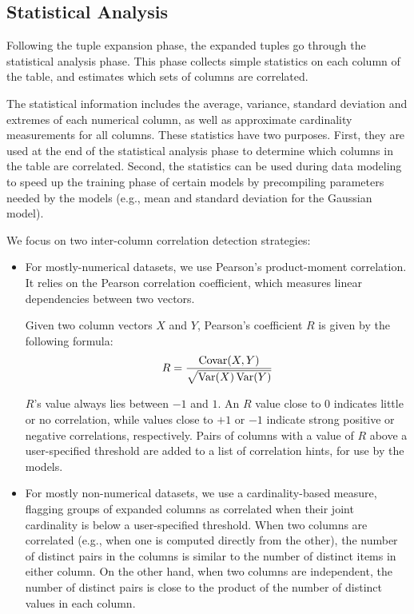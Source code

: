 \subsection{Statistical Analysis}
\label{sec:statistical-analysis}

Following the tuple expansion phase, the expanded tuples go through the statistical analysis phase. This phase collects simple statistics on each column of the table, and estimates which sets of columns are correlated.

The statistical information includes the average, variance, standard deviation and extremes of each numerical column, as well as approximate cardinality measurements for all columns. These statistics have two purposes. First, they are used at the end of the statistical analysis phase to determine which columns in the table are correlated. Second, the statistics can be used during data modeling to speed up the training phase of certain models by precompiling parameters needed by the models (e.g., mean and standard deviation for the Gaussian model).

We focus on two inter-column correlation detection strategies:

\begin{itemize}
\item For mostly-numerical datasets, we use Pearson's product-moment
  correlation. It relies on the Pearson correlation coefficient,
  which measures linear dependencies between two vectors.

  Given two column vectors $X$ and $Y$, Pearson's coefficient $R$ is given by the following formula:
  \begin{align}
    \label{eqn:pearson}
    R = \frac{\operatorname{Covar}(X,Y)}{\sqrt{\operatorname{Var}(X)\operatorname{Var}(Y)}}
  \end{align}

  $R$'s value always lies between $-1$ and $1$. An $R$ value close to 0 indicates little or no correlation, while values close to $+1$ or $-1$ indicate strong positive or negative correlations, respectively. Pairs of columns with a value of \(R\) above a user-specified threshold are added to a list of correlation hints, for use by the models.

\item For mostly non-numerical datasets, we use a cardinality-based measure, flagging groups of expanded columns as correlated when their joint cardinality is below a user-specified threshold. When two columns are correlated (e.g., when one is computed directly from the other), the number of distinct pairs in the columns is similar to the number of distinct items in either column. On the other hand, when two columns are independent, the number of distinct pairs is close to the product of the number of distinct values in each column.
\end{itemize}

